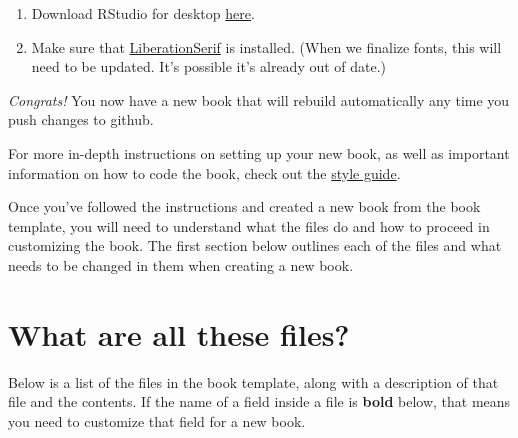 \documentclass[
]{book}
\providecommand{\tightlist}{%
  \setlength{\itemsep}{0pt}\setlength{\parskip}{0pt}}
\begin{document}
\begin{enumerate}
\def\labelenumi{\arabic{enumi}.}
\tightlist
\item
  Download RStudio for desktop \href{https://rstudio.com/products/rstudio/}{here}.
\item
  Make sure that \href{https://www.fontsquirrel.com/fonts/liberation-serif}{LiberationSerif} is installed. (When we finalize fonts, this will need to be updated. It's possible it's already out of date.)
\end{enumerate}

\emph{Congrats!} You now have a new book that will rebuild automatically any time you push changes to github.

For more in-depth instructions on setting up your new book, as well as important information on how to code the book, check out the \href{https://warhornmedia.github.io/style-guide}{style guide}.

Once you've followed the instructions and created a new book from the book template, you will need to understand what the files do and how to proceed in customizing the book. The first section below outlines each of the files and what needs to be changed in them when creating a new book.

\hypertarget{what-are-all-these-files}{%
\section{What are all these files?}\label{what-are-all-these-files}}

Below is a list of the files in the book template, along with a description of that file and the contents. If the name of a field inside a file is \textbf{bold} below, that means you need to customize that field for a new book.
\end{document}

